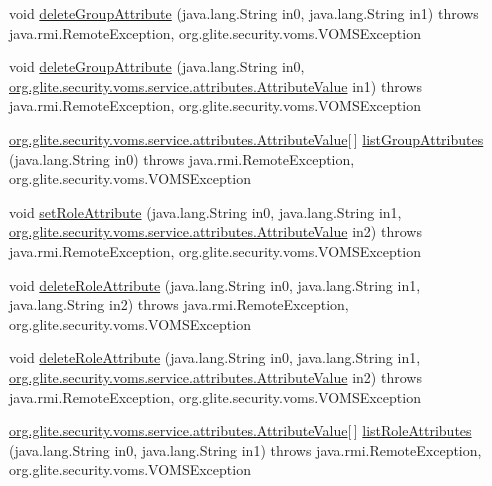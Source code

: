 \begin{DoxyCompactItemize}
\item 
void \hyperlink{interfaceorg_1_1glite_1_1security_1_1voms_1_1service_1_1attributes_1_1VOMSAttributes_a21b03cab1701c30952181ad405e2e368}{deleteGroupAttribute} (java.lang.String in0, java.lang.String in1)  throws java.rmi.RemoteException, org.glite.security.voms.VOMSException
\item 
void \hyperlink{interfaceorg_1_1glite_1_1security_1_1voms_1_1service_1_1attributes_1_1VOMSAttributes_a5564060b855e3a2eeb79ce98b5d74e4c}{deleteGroupAttribute} (java.lang.String in0, \hyperlink{classorg_1_1glite_1_1security_1_1voms_1_1service_1_1attributes_1_1AttributeValue}{org.glite.security.voms.service.attributes.AttributeValue} in1)  throws java.rmi.RemoteException, org.glite.security.voms.VOMSException
\item 
\hyperlink{classorg_1_1glite_1_1security_1_1voms_1_1service_1_1attributes_1_1AttributeValue}{org.glite.security.voms.service.attributes.AttributeValue}\mbox{[}$\,$\mbox{]} \hyperlink{interfaceorg_1_1glite_1_1security_1_1voms_1_1service_1_1attributes_1_1VOMSAttributes_a1b781f52a2662f8cf68c602f5be65d72}{listGroupAttributes} (java.lang.String in0)  throws java.rmi.RemoteException, org.glite.security.voms.VOMSException
\item 
void \hyperlink{interfaceorg_1_1glite_1_1security_1_1voms_1_1service_1_1attributes_1_1VOMSAttributes_a7ac38a7f4c61afcb966abc3854a65831}{setRoleAttribute} (java.lang.String in0, java.lang.String in1, \hyperlink{classorg_1_1glite_1_1security_1_1voms_1_1service_1_1attributes_1_1AttributeValue}{org.glite.security.voms.service.attributes.AttributeValue} in2)  throws java.rmi.RemoteException, org.glite.security.voms.VOMSException
\item 
void \hyperlink{interfaceorg_1_1glite_1_1security_1_1voms_1_1service_1_1attributes_1_1VOMSAttributes_a10e8d9e56da612471f8f2ce5972d755f}{deleteRoleAttribute} (java.lang.String in0, java.lang.String in1, java.lang.String in2)  throws java.rmi.RemoteException, org.glite.security.voms.VOMSException
\item 
void \hyperlink{interfaceorg_1_1glite_1_1security_1_1voms_1_1service_1_1attributes_1_1VOMSAttributes_aa728f2ded931b28c408c9e6e19752317}{deleteRoleAttribute} (java.lang.String in0, java.lang.String in1, \hyperlink{classorg_1_1glite_1_1security_1_1voms_1_1service_1_1attributes_1_1AttributeValue}{org.glite.security.voms.service.attributes.AttributeValue} in2)  throws java.rmi.RemoteException, org.glite.security.voms.VOMSException
\item 
\hyperlink{classorg_1_1glite_1_1security_1_1voms_1_1service_1_1attributes_1_1AttributeValue}{org.glite.security.voms.service.attributes.AttributeValue}\mbox{[}$\,$\mbox{]} \hyperlink{interfaceorg_1_1glite_1_1security_1_1voms_1_1service_1_1attributes_1_1VOMSAttributes_aeb3efd918efd7c9b131d1f2d1fe2ca4b}{listRoleAttributes} (java.lang.String in0, java.lang.String in1)  throws java.rmi.RemoteException, org.glite.security.voms.VOMSException
\end{DoxyCompactItemize}


